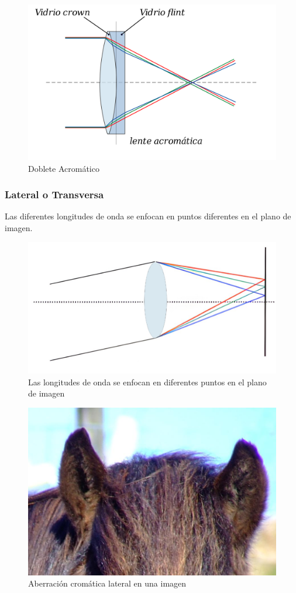 \documentclass{article}
\begin{document}
\begin{figure}[H]
	\centering
	\includegraphics[width=0.70\linewidth]{Figuras/Axial_Aberration_3}
	\caption{Doblete Acromático}
	\label{fig:axialaberration3}
\end{figure}

\subsubsection{Lateral o Transversa}

Las diferentes longitudes de onda se enfocan en puntos diferentes en el plano de imagen.

\begin{figure}[H]
	\centering
	\includegraphics[width=0.65\linewidth]{Figuras/Lateral_Aberration}
	\caption{Las longitudes de onda se enfocan en diferentes puntos en el plano de imagen}
	\label{fig:lateralaberration}
\end{figure}

\begin{figure}[H]
	\centering
	\includegraphics[width=0.65\linewidth]{Figuras/Lateral_Aberration_2}
	\caption{Aberración cromática lateral en una imagen}
	\label{fig:lateralaberration2}
\end{figure}
\end{document}
